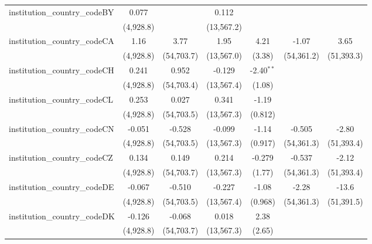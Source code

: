 \begin{tabular}{lcccccc}
   institution\_country\_codeBY          & 0.077         &             & 0.112         &              &              &   \\   
                                         & (4,928.8)     &             & (13,567.2)    &              &              &   \\   
   institution\_country\_codeCA          & 1.16          & 3.77        & 1.95          & 4.21         & -1.07        & 3.65\\   
                                         & (4,928.8)     & (54,703.7)  & (13,567.0)    & (3.38)       & (54,361.2)   & (51,393.3)\\   
   institution\_country\_codeCH          & 0.241         & 0.952       & -0.129        & -2.40$^{**}$ &              &   \\   
                                         & (4,928.8)     & (54,703.4)  & (13,567.4)    & (1.08)       &              &   \\   
   institution\_country\_codeCL          & 0.253         & 0.027       & 0.341         & -1.19        &              &   \\   
                                         & (4,928.8)     & (54,703.5)  & (13,567.3)    & (0.812)      &              &   \\   
   institution\_country\_codeCN          & -0.051        & -0.528      & -0.099        & -1.14        & -0.505       & -2.80\\   
                                         & (4,928.8)     & (54,703.5)  & (13,567.3)    & (0.917)      & (54,361.3)   & (51,393.4)\\   
   institution\_country\_codeCZ          & 0.134         & 0.149       & 0.214         & -0.279       & -0.537       & -2.12\\   
                                         & (4,928.8)     & (54,703.7)  & (13,567.3)    & (1.77)       & (54,361.3)   & (51,393.4)\\   
   institution\_country\_codeDE          & -0.067        & -0.510      & -0.227        & -1.08        & -2.28        & -13.6\\   
                                         & (4,928.8)     & (54,703.5)  & (13,567.4)    & (0.968)      & (54,361.3)   & (51,391.5)\\   
   institution\_country\_codeDK          & -0.126        & -0.068      & 0.018         & 2.38         &              &   \\   
                                         & (4,928.8)     & (54,703.7)  & (13,567.3)    & (2.65)       &              &   \\   

\end{tabular}
